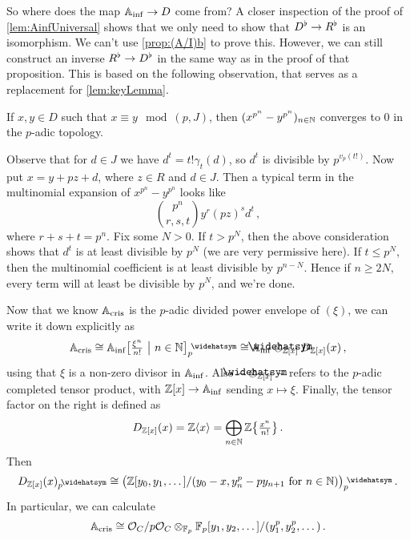 \documentclass[a4paper, 10pt, oneside, DIV=9, chapterprefix=true, numbers=enddot,bibliography=totoc]{scrbook}
\begin{document}
So where does the map $\IA_\inf\morphism D$ come from? A closer inspection of the proof of \cref{lem:AinfUniversal} shows that we only need to show that $D^\flat\morphism R^\flat$ is an isomorphism. We can't use \cref{prop:(A/I)b} to prove this. However, we can still construct an inverse $R^\flat\morphism D^\flat$ in the same way as in the proof of that proposition. This is based on the following observation, that serves as a replacement for \cref{lem:keyLemma}.
\begin{lem*}
	If $x,y\in D$ such that $x\equiv y\mod (p,J)$, then $(x^{p^n}-y^{p^n})_{n\in\mathbb{N}}$ converges to $0$ in the $p$-adic topology.
\end{lem*}
\begin{proof*}
	Observe that for $d\in J$ we have $d^t=t!\gamma_t(d)$, so $d^t$ is divisible by $p^{v_p(t!)}$. Now put $x=y+pz+d$, where $z\in R$ and $d\in J$. Then a typical term in the multinomial expansion of $x^{p^n}-y^{p^n}$ looks like
	\begin{equation*}
		\binom{p^n}{r,s,t}y^r(pz)^sd^t\,,
	\end{equation*}
	where $r+s+t=p^n$. Fix some $N>0$. If $t>p^N$, then the above consideration shows that $d^t$ is at least divisible by $p^N$ (we are very permissive here). If $t\leq p^N$, then the multinomial coefficient is at least divisible by $p^{n-N}$. Hence if $n\geq 2N$, every term will at least be divisible by $p^N$, and we're done.
\end{proof*}
Now that we know $\mathbb{A}_{\mathrm{cris}}$ is the $p$-adic divided power envelope of $(\xi)$, we can write it down explicitly as
\begin{equation*}
	\IA_\cris\cong \IA_\inf\big[\textstyle\frac{\xi^n}{n!}\ \big|\  n\in\IN\big]_p^\complete\cong \IA_\inf\cotimes_{\IZ[x]}D_{\IZ[x]}(x)\,,
\end{equation*}
using that $\xi$ is a non-zero divisor in $\mathbb{A}_{\mathrm{inf}}$. Also $-\cotimes_{\IZ[x]}-$ refers to the $p$-adic completed tensor product, with $\IZ[x]\morphism\IA_\inf$ sending $x\mapsto \xi$. Finally, the tensor factor on the right is defined as
\begin{equation*}
	D_{\mathbb{Z}[x]}(x)=\mathbb{Z}\langle x\rangle =\bigoplus_{n\in\mathbb{N}}\mathbb{Z}\big\{\textstyle\frac{x^n}{n!}\big\}\,.
\end{equation*}
Then
\begin{equation*}
	D_{\IZ[x]}(x)_p^\complete\cong\big(\IZ[y_0,y_1,\dotsc]/(y_0-x,y_n^p-py_{n+1} \text{ for }n\in\IN)\big)_p^\complete\,.
\end{equation*}
In particular, we can calculate
\begin{equation*}
	\mathbb{A}_{\mathrm{cris}}\cong \mathcal{O}_C/p\mathcal{O}_C\otimes_{\mathbb{F}_p}\mathbb{F}_p[y_1,y_2,\dotsc]/(y_1^p,y_2^p,\dotsc)\,.
\end{equation*}
\end{document}
